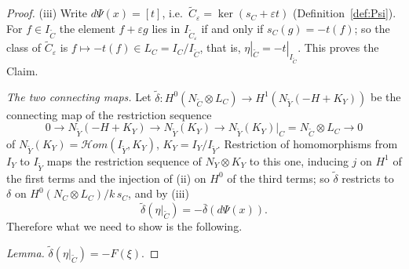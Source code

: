\documentclass[11pt,reqno]{amsart}
\theoremstyle{plain}
\theoremstyle{definition}
\newcommand{\sHom}{\mathcal{H}om}
\newcommand{\Yt}{\widetilde{Y}}
\newcommand{\Ct}{\widetilde{C}}
\newcommand{\NY}{N_{Y}}
\newcommand{\NYt}{N_{\Yt}}
\begin{document}
\begin{proof}
(iii) Write $d\Psi(x)=[t]$, i.e.\ $\Ct_\varepsilon=\ker(s_C+\varepsilon t)$ (Definition~\ref{def:Psi}). For $f\in I_{\Ct}$ the element $f+\varepsilon g$ lies in $I_{\Ct_\varepsilon}$ if and only if $s_C(g)=-t(f)$; so the class of $\Ct_\varepsilon$ is $f\mapsto-t(f)\in L_C=I_C/I_{\Ct}$, that is, $\eta|_{\Ct}=-t|_{I_{\Ct}}$. This proves the Claim.

\emph{The two connecting maps.} Let $\tilde\delta\colon H^0(N_{\Ct}\otimes L_C)\to H^1(\NYt(-H+K_Y))$ be the connecting map of the restriction sequence
\[
0\to\NYt(-H+K_Y)\to\NYt(K_Y)\to\NYt(K_Y)|_C=N_{\Ct}\otimes L_C\to0
\]
of $\NYt(K_Y)=\sHom(I_{\Yt},K_Y)$, $K_Y=I_Y/I_{\Yt}$. Restriction of homomorphisms from $I_Y$ to $I_{\Yt}$ maps the restriction sequence of $\NY\otimes K_Y$ to this one, inducing $j$ on $H^1$ of the first terms and the injection of (ii) on $H^0$ of the third terms; so $\tilde\delta$ restricts to $\delta$ on $H^0(N_C\otimes L_C)/k\,s_C$, and by (iii)
\[
\tilde\delta(\eta|_{\Ct})=-\bar\delta(d\Psi(x)) .
\]
Therefore what we need to show is the following.

\emph{Lemma.} $\tilde\delta(\eta|_{\Ct})=-F(\xi)$.


\end{proof}
\end{document}
